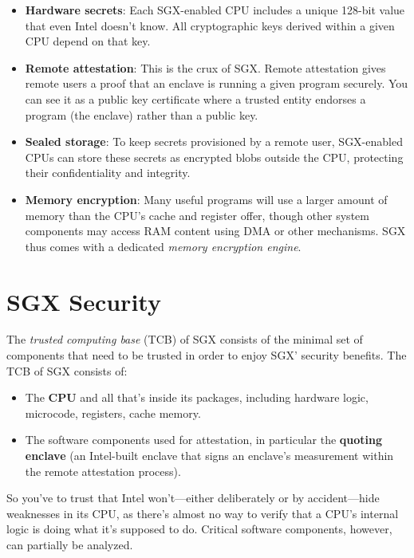 \documentclass[]{article}
\begin{document}
\begin{itemize}
\item
  \textbf{Hardware secrets}: Each SGX-enabled CPU includes a unique
  128-bit value that even Intel doesn't know. All cryptographic keys
  derived within a given CPU depend on that key.
\item
  \textbf{Remote attestation}: This is the crux of SGX. Remote
  attestation gives remote users a proof that an enclave is running a
  given program securely. You can see it as a public key certificate
  where a trusted entity endorses a program (the enclave) rather than a
  public key.
\item
  \textbf{Sealed storage}: To keep secrets provisioned by a remote user,
  SGX-enabled CPUs can store these secrets as encrypted blobs outside
  the CPU, protecting their confidentiality and integrity.
\item
  \textbf{Memory encryption}: Many useful programs will use a larger
  amount of memory than the CPU's cache and register offer, though other
  system components may access RAM content using DMA or other
  mechanisms. SGX thus comes with a dedicated \emph{memory encryption
  engine}.
\end{itemize}

\section{SGX Security}\label{sgx-security}

The \emph{trusted computing base} (TCB) of SGX consists of the minimal
set of components that need to be trusted in order to enjoy SGX'
security benefits. The TCB of SGX consists of:

\begin{itemize}
\item
  The \textbf{CPU} and all that's inside its packages, including
  hardware logic, microcode, registers, cache memory.
\item
  The software components used for attestation, in particular the
  \textbf{quoting enclave} (an Intel-built enclave that signs an
  enclave's measurement within the remote attestation process).
\end{itemize}

So you've to trust that Intel won't---either deliberately or by
accident---hide weaknesses in its CPU, as there's almost no way to
verify that a CPU's internal logic is doing what it's supposed to do.
Critical software components, however, can partially be analyzed.
\end{document}
